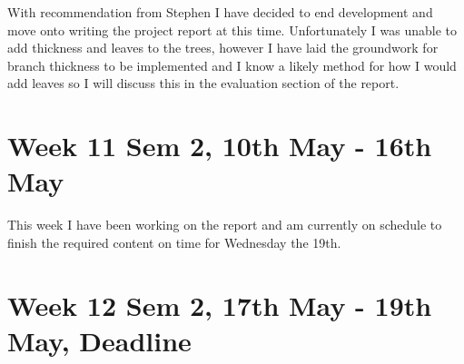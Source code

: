 \documentclass[11pt]{article}
\begin{document}
With recommendation from Stephen I have decided to end development and move onto writing the 
project report at this time. Unfortunately I was unable to add thickness and leaves to the 
trees, however I have laid the groundwork for branch thickness to be implemented and I know 
a likely method for how I would add leaves so I will discuss this in the evaluation section of 
the report.

\section*{Week 11 Sem 2, 10th May - 16th May}
This week I have been working on the report and am currently on schedule to finish the required 
content on time for Wednesday the 19th.

\section*{Week 12 Sem 2, 17th May - 19th May, Deadline}
\end{document}
